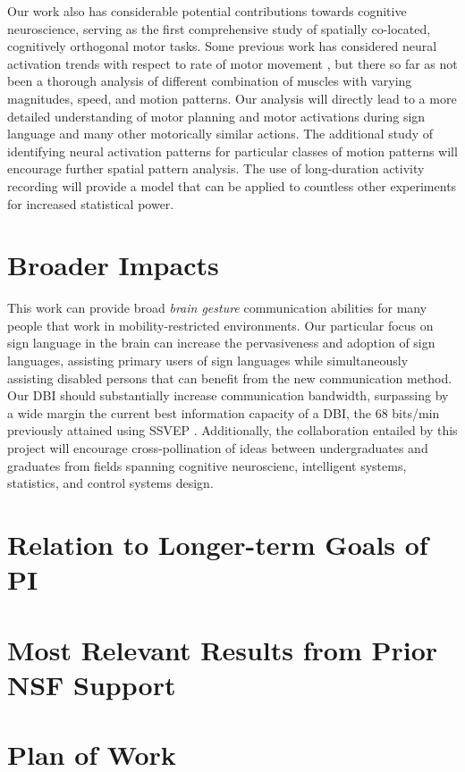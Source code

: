 \documentclass{proposal}
\begin{document}
Our work also has considerable potential contributions towards cognitive neuroscience, serving as the first comprehensive study of spatially co-located, cognitively orthogonal motor tasks. Some previous work has considered neural activation trends with respect to rate of motor movement \cite[]{rao1996rbf}, but there so far as not been a thorough analysis of different combination of muscles with varying magnitudes, speed, and motion patterns. Our analysis will directly lead to a more detailed understanding of motor planning and motor activations during sign language and many other motorically similar actions. The additional study of identifying neural activation patterns for particular classes of motion patterns will encourage further spatial pattern analysis. The use of long-duration activity recording will provide a model that can be applied to countless other experiments for increased statistical power.


\section{Broader Impacts}

This work can provide broad \textit{brain gesture} communication abilities for many people that work in mobility-restricted environments. Our particular focus on sign language in the brain can increase the pervasiveness and adoption of sign languages, assisting primary users of sign languages while simultaneously assisting disabled persons that can benefit from the new communication method. Our DBI should substantially increase communication bandwidth, surpassing by a wide margin the current best information capacity of a DBI, the 68 bits/min previously attained using SSVEP \cite[]{gao2003bbe}. Additionally, the collaboration entailed by this project will encourage cross-pollination of ideas between undergraduates and graduates from fields spanning cognitive neuroscienc, intelligent systems, statistics, and control systems design.


\section{Relation to Longer-term Goals of PI}

\section{Most Relevant Results from Prior NSF Support}

\section{Plan of Work}
\end{document}
